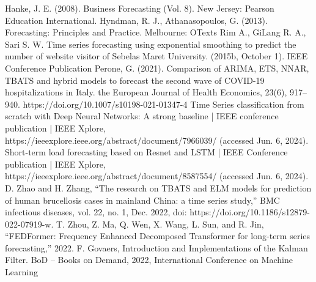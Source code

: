 \documentclass[conference]{IEEEtran}
\begin{document}
\begin{thebibliography}{00}
 Hanke, J. E. (2008). Business Forecasting (Vol. 8). New Jersey:
Pearson Education International.
 Hyndman, R. J., Athanasopoulos, G. (2013). Forecasting:
Principles and Practice. Melbourne: OTexts
 Rim A., GiLang R. A., Sari S. W. Time series forecasting using exponential smoothing to predict the number of website visitor of Sebelas Maret University. (2015b, October 1). IEEE Conference Publication
Perone, G. (2021). Comparison of ARIMA, ETS, NNAR, TBATS and hybrid models to forecast the second wave of COVID-19 hospitalizations in Italy. the European Journal of Health Economics, 23(6), 917–940. https://doi.org/10.1007/s10198-021-01347-4
Time Series classification from scratch with Deep Neural Networks: A strong baseline | IEEE conference publication | IEEE Xplore, https://ieeexplore.ieee.org/abstract/document/7966039/ (accessed Jun. 6, 2024). 
Short-term load forecasting based on Resnet and LSTM | IEEE Conference publication | IEEE Xplore, https://ieeexplore.ieee.org/abstract/document/8587554/ (accessed Jun. 6, 2024).
D. Zhao and H. Zhang, “The research on TBATS and ELM models for prediction of human brucellosis cases in mainland China: a time series study,” BMC infectious diseases, vol. 22, no. 1, Dec. 2022, doi: https://doi.org/10.1186/s12879-022-07919-w.
T. Zhou, Z. Ma, Q. Wen, X. Wang, L. Sun, and R. Jin, “FEDFormer: Frequency Enhanced Decomposed Transformer for long-term series forecasting,” 2022. 
F. Govaers, Introduction and Implementations of the Kalman Filter. BoD – Books on Demand, 2022, International Conference on Machine Learning
‌
\end{thebibliography}
\end{document}
